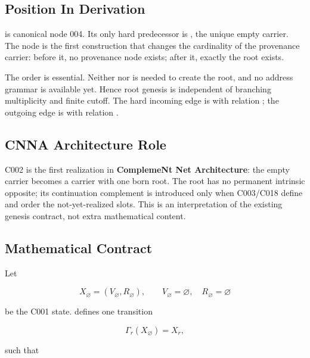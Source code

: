 \subsection{Position In Derivation}\label{position-in-derivation}

\texttt{\protect{}} is canonical node 004. Its only hard predecessor is
\texttt{\protect{}}, the unique empty carrier. The node is the first
construction that changes the cardinality of the provenance carrier:
before it, no provenance node exists; after it, exactly the root exists.

The order is essential. Neither \texttt{\protect{}} nor \texttt{\protect{}} is
needed to create the root, and no address grammar is available yet.
Hence root genesis is independent of branching multiplicity and finite
cutoff. The hard incoming edge is
\texttt{\protect{}} with relation
\texttt{\protect{}}; the outgoing edge is
\texttt{\protect{}} with relation
\texttt{\protect{}}.

\subsection{CNNA Architecture Role}\label{cnna-architecture-role-1}

C002 is the first realization in \textbf{ComplemeNt Net Architecture}:
the empty carrier becomes a carrier with one born root. The root has no
permanent intrinsic opposite; its continuation complement is introduced
only when C003/C018 define and order the not-yet-realized slots. This is
an interpretation of the existing genesis contract, not extra
mathematical content.

\subsection{Mathematical Contract}\label{mathematical-contract}

Let

\[
X_\varnothing=(V_\varnothing,R_\varnothing),\qquad V_\varnothing=\varnothing,\quad R_\varnothing=\varnothing
\]

be the C001 state. \texttt{\protect{}} defines one transition

\[
\Gamma_r(X_\varnothing)=X_r,
\]

such that

